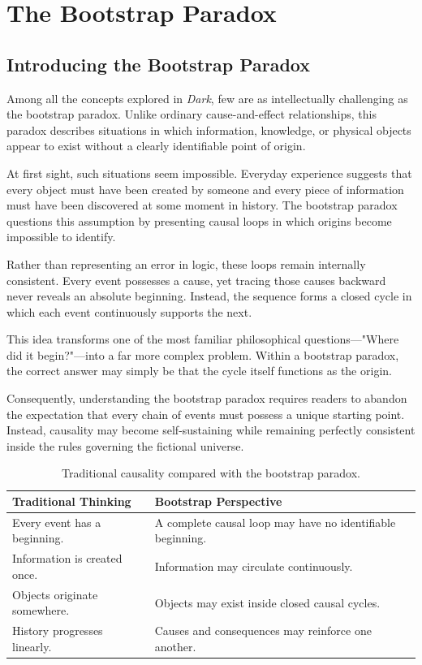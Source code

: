 \documentclass[12pt,oneside,openany]{book}
\begin{document}
\chapter{The Bootstrap Paradox}
\section{Introducing the Bootstrap Paradox}

Among all the concepts explored in \textit{Dark}, few are as intellectually
challenging as the bootstrap paradox. Unlike ordinary cause-and-effect
relationships, this paradox describes situations in which information,
knowledge, or physical objects appear to exist without a clearly identifiable
point of origin.

At first sight, such situations seem impossible. Everyday experience suggests
that every object must have been created by someone and every piece of
information must have been discovered at some moment in history. The bootstrap
paradox questions this assumption by presenting causal loops in which origins
become impossible to identify.

Rather than representing an error in logic, these loops remain internally
consistent. Every event possesses a cause, yet tracing those causes backward
never reveals an absolute beginning. Instead, the sequence forms a closed
cycle in which each event continuously supports the next.

This idea transforms one of the most familiar philosophical questions—"Where
did it begin?"—into a far more complex problem. Within a bootstrap paradox,
the correct answer may simply be that the cycle itself functions as the
origin.

Consequently, understanding the bootstrap paradox requires readers to abandon
the expectation that every chain of events must possess a unique starting
point. Instead, causality may become self-sustaining while remaining perfectly
consistent inside the rules governing the fictional universe.

\begin{table}[H]
\centering
\begin{tabular}{|p{4.2cm}|p{7.8cm}|}
\hline
\textbf{Traditional Thinking} & \textbf{Bootstrap Perspective}\\
\hline
Every event has a beginning. & A complete causal loop may have no identifiable beginning.\\
\hline
Information is created once. & Information may circulate continuously.\\
\hline
Objects originate somewhere. & Objects may exist inside closed causal cycles.\\
\hline
History progresses linearly. & Causes and consequences may reinforce one another.\\
\hline
\end{tabular}
\caption{Traditional causality compared with the bootstrap paradox.}
\end{table}
\end{document}
